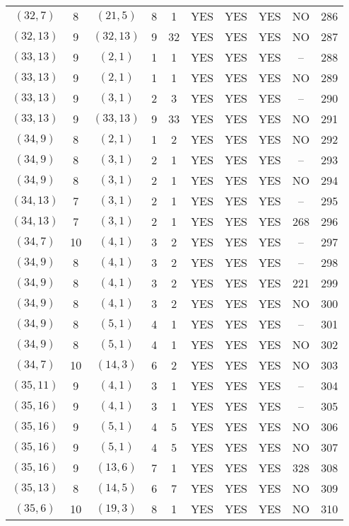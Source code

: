 \begin{longtable}{|c|c|c|c|c|c|c|c|c|c|}
$(32, 7)$ & 8 & $(21, 5)$ & 8 & 1 & YES & YES & YES & NO & 286\\
$(32, 13)$ & 9 & $(32, 13)$ & 9 & 32 & YES & YES & YES & NO & 287\\
$(33, 13)$ & 9 & $(2, 1)$ & 1 & 1 & YES & YES & YES & -- & 288\\
$(33, 13)$ & 9 & $(2, 1)$ & 1 & 1 & YES & YES & YES & NO & 289\\
$(33, 13)$ & 9 & $(3, 1)$ & 2 & 3 & YES & YES & YES & -- & 290\\
$(33, 13)$ & 9 & $(33, 13)$ & 9 & 33 & YES & YES & YES & NO & 291\\
$(34, 9)$ & 8 & $(2, 1)$ & 1 & 2 & YES & YES & YES & NO & 292\\
$(34, 9)$ & 8 & $(3, 1)$ & 2 & 1 & YES & YES & YES & -- & 293\\
$(34, 9)$ & 8 & $(3, 1)$ & 2 & 1 & YES & YES & YES & NO & 294\\
$(34, 13)$ & 7 & $(3, 1)$ & 2 & 1 & YES & YES & YES & -- & 295\\
$(34, 13)$ & 7 & $(3, 1)$ & 2 & 1 & YES & YES & YES & 268 & 296\\
$(34, 7)$ & 10 & $(4, 1)$ & 3 & 2 & YES & YES & YES & -- & 297\\
$(34, 9)$ & 8 & $(4, 1)$ & 3 & 2 & YES & YES & YES & -- & 298\\
$(34, 9)$ & 8 & $(4, 1)$ & 3 & 2 & YES & YES & YES & 221 & 299\\
$(34, 9)$ & 8 & $(4, 1)$ & 3 & 2 & YES & YES & YES & NO & 300\\
$(34, 9)$ & 8 & $(5, 1)$ & 4 & 1 & YES & YES & YES & -- & 301\\
$(34, 9)$ & 8 & $(5, 1)$ & 4 & 1 & YES & YES & YES & NO & 302\\
$(34, 7)$ & 10 & $(14, 3)$ & 6 & 2 & YES & YES & YES & NO & 303\\
$(35, 11)$ & 9 & $(4, 1)$ & 3 & 1 & YES & YES & YES & -- & 304\\
$(35, 16)$ & 9 & $(4, 1)$ & 3 & 1 & YES & YES & YES & -- & 305\\
$(35, 16)$ & 9 & $(5, 1)$ & 4 & 5 & YES & YES & YES & NO & 306\\
$(35, 16)$ & 9 & $(5, 1)$ & 4 & 5 & YES & YES & YES & NO & 307\\
$(35, 16)$ & 9 & $(13, 6)$ & 7 & 1 & YES & YES & YES & 328 & 308\\
$(35, 13)$ & 8 & $(14, 5)$ & 6 & 7 & YES & YES & YES & NO & 309\\
$(35, 6)$ & 10 & $(19, 3)$ & 8 & 1 & YES & YES & YES & NO & 310\\

\end{longtable}
